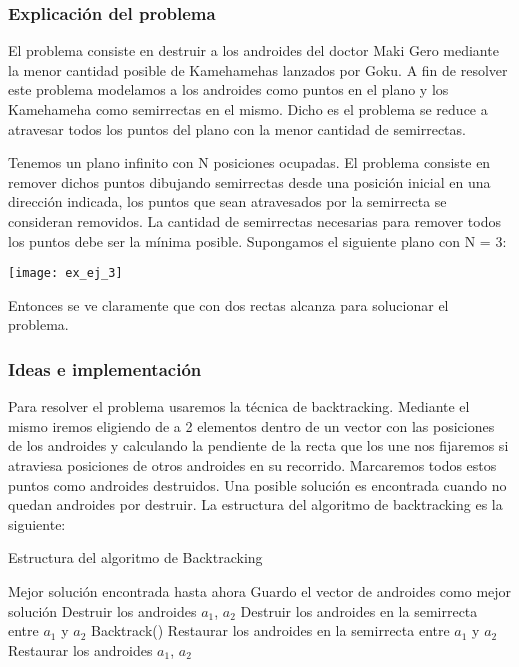 \subsubsection{Explicación del problema}
El problema consiste en destruir a los androides del doctor Maki Gero mediante la menor cantidad posible de Kamehamehas lanzados por Goku.
A fin de resolver este problema modelamos a los androides como puntos en el plano y los Kamehameha como semirrectas en el mismo. Dicho es el problema se reduce a atravesar todos los puntos del plano con la menor cantidad de semirrectas.

Tenemos un plano infinito con N posiciones ocupadas. El problema consiste en remover dichos puntos dibujando semirrectas desde una posición inicial en una dirección indicada, los puntos que sean atravesados por la semirrecta se consideran removidos. La cantidad de semirrectas necesarias para remover todos los puntos debe ser la mínima posible.
Supongamos el siguiente plano con N = 3:

\texttt{[image: ex\_ej\_3]}


Entonces se ve claramente que con dos rectas alcanza para solucionar el problema.






\subsubsection{Ideas e implementación}
Para resolver el problema usaremos la técnica de backtracking. Mediante el mismo iremos eligiendo de a 2 elementos dentro de un vector con las posiciones de los androides y calculando la pendiente de la recta que los une nos fijaremos si atraviesa posiciones de otros androides en su recorrido. Marcaremos todos estos puntos como androides destruidos.
Una posible solución es encontrada cuando no quedan androides por destruir.
La estructura del algoritmo de backtracking es la siguiente:

\begin{algorithm}[h!]
\caption{Estructura del algoritmo de Backtracking}
\begin{algorithmic}[1]
		\State Mejor solución encontrada hasta ahora
		\State Guardo el vector de androides como mejor solución
	\Else
                    \State Destruir los androides $a_1$, $a_2$
                    \State Destruir los androides en la semirrecta entre $a_1$ y $a_2$
                    \State Backtrack()
                    \State Restaurar los androides en la semirrecta entre $a_1$ y $a_2$
                    \State Restaurar los androides $a_1$, $a_2$                        
                \EndIf
            \EndIf
		\EndFor
	\EndIf
	\EndFunction
\end{algorithmic}
\end{algorithm}

